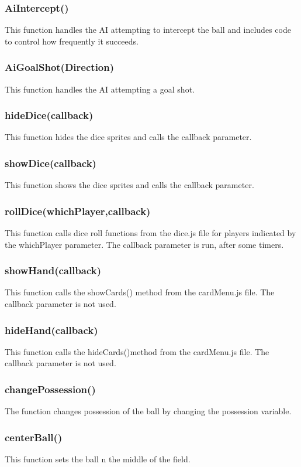 \documentclass[12pt]{article}
\begin{document}
\subsubsection*{AiIntercept()}
This function handles the AI attempting to intercept the ball and includes code to control how 
frequently it succeeds. 
\subsubsection*{AiGoalShot(Direction)}
This function handles the AI attempting a goal shot. 
\subsubsection*{hideDice(callback)}
This function hides the dice sprites and calls the callback
parameter. 
\subsubsection*{showDice(callback)}
This function shows the dice sprites and calls the callback 
parameter.
\subsubsection*{rollDice(whichPlayer,callback)}
This function calls dice roll functions from the dice.js file 
for players indicated by the whichPlayer parameter. The callback
parameter is run, after some timers. 
\subsubsection*{showHand(callback)}
This function calls the showCards() method from the cardMenu.js 
file. The callback parameter is not used. 
\subsubsection*{hideHand(callback)}
This function calls the hideCards()method from the cardMenu.js file.
The callback parameter is not used. 
\subsubsection*{changePossession()}
The function changes possession of the ball by changing the
 possession variable. 
\subsubsection*{centerBall()}
This function sets the ball n the middle of the field. 
\end{document}

